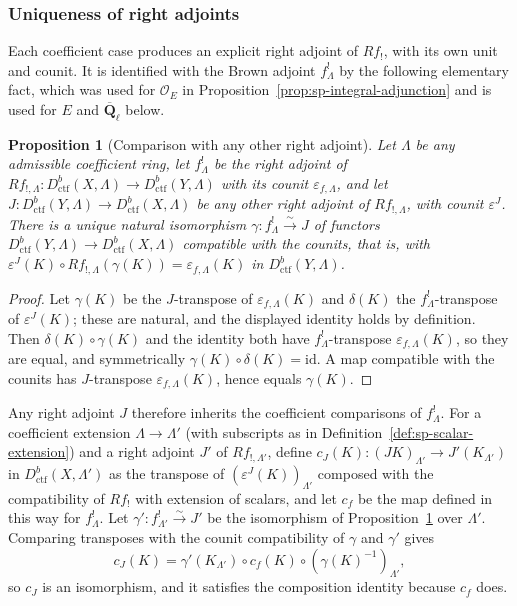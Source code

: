 \documentclass[11pt,a4paper]{article}
\numberwithin{equation}{section}
\newtheorem{proposition}[theorem]{Proposition}
\theoremstyle{definition}
\theoremstyle{remark}
\newcommand{\Qbar}{\overline{\mathbf Q}_\ell}
\newcommand{\Dctf}{D^b_{\mathrm{ctf}}}
\begin{document}
\subsubsection{Uniqueness of right adjoints}

Each coefficient case produces an explicit right adjoint of $Rf_!$,
with its own unit and counit. It is identified with the Brown adjoint
$f^!_\Lambda$ by the following elementary fact, which was used for
$\mathcal O_E$ in Proposition~\ref{prop:sp-integral-adjunction} and is
used for $E$ and $\Qbar$ below.

\begin{proposition}[Comparison with any other right adjoint]
\label{prop:sp-unique-adjoint}
Let $\Lambda$ be any admissible coefficient ring, let
$f_\Lambda^!$ be the right adjoint of
$Rf_{!,\Lambda}:\Dctf(X,\Lambda)\to\Dctf(Y,\Lambda)$
with its counit $\varepsilon_{f,\Lambda}$, and let
$J:\Dctf(Y,\Lambda)\to\Dctf(X,\Lambda)$ be any other
right adjoint of $Rf_{!,\Lambda}$, with counit $\varepsilon^J$. There is a unique natural isomorphism
$\gamma:f_\Lambda^!\xrightarrow{\sim}J$ of functors
$\Dctf(Y,\Lambda)\to\Dctf(X,\Lambda)$ compatible with the counits, that
is, with $\varepsilon^J(K)\circ Rf_{!,\Lambda}(\gamma(K))
=\varepsilon_{f,\Lambda}(K)$ in $\Dctf(Y,\Lambda)$.
\end{proposition}
\begin{proof}
Let $\gamma(K)$ be the $J$-transpose of $\varepsilon_{f,\Lambda}(K)$ and
$\delta(K)$ the $f_\Lambda^!$-transpose of $\varepsilon^J(K)$; these are
natural, and the displayed identity holds by definition. Then
$\delta(K)\circ\gamma(K)$ and the identity both have
$f^!_\Lambda$-transpose $\varepsilon_{f,\Lambda}(K)$, so they are equal,
and symmetrically $\gamma(K)\circ\delta(K)=\mathrm{id}$. A map compatible
with the counits has $J$-transpose $\varepsilon_{f,\Lambda}(K)$, hence
equals $\gamma(K)$.
\end{proof}

Any right adjoint $J$ therefore inherits the coefficient comparisons
of $f_\Lambda^!$. For a coefficient extension $\Lambda\to\Lambda'$ (with
subscripts as in Definition~\ref{def:sp-scalar-extension}) and a right
adjoint $J'$ of $Rf_{!,\Lambda'}$, define
$c_J(K):(JK)_{\Lambda'}\to J'(K_{\Lambda'})$ in $\Dctf(X,\Lambda')$ as the transpose of
$(\varepsilon^J(K))_{\Lambda'}$ composed with the compatibility of
$Rf_!$ with extension of scalars, and let $c_f$ be the map defined in this way
for $f_\Lambda^!$. Let $\gamma'\colon f^!_{\Lambda'}\xrightarrow{\sim}J'$ be the
isomorphism of Proposition~\ref{prop:sp-unique-adjoint} over $\Lambda'$.
Comparing transposes with the counit compatibility
of $\gamma$ and $\gamma'$ gives
\[
 c_J(K)=\gamma'(K_{\Lambda'})\circ c_f(K)\circ(\gamma(K)^{-1})_{\Lambda'},
\]
so $c_J$ is an isomorphism, and it satisfies the composition identity
because $c_f$ does.
\end{document}
